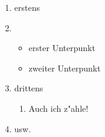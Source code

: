 \begin{enumerate}
\item erstens
\item \begin{itemize}
\item erster Unterpunkt
\item zweiter Unterpunkt
\end{itemize}
\item drittens
\begin{enumerate}
\item Auch ich z"ahle!
\end{enumerate}
\item usw.
\end{enumerate}